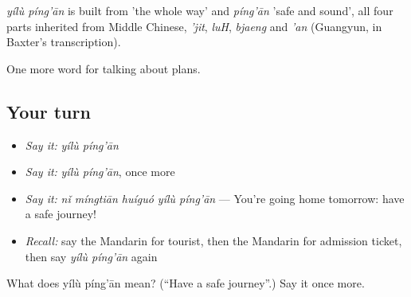 \begin{cousinweb}
\emph{yílù píng'ān} is built from  'the whole way' and \emph{píng'ān} 'safe and sound', all four parts inherited from Middle Chinese, \emph{'jit}, \emph{luH}, \emph{bjaeng} and \emph{'an} (Guangyun, in Baxter's transcription).
\end{cousinweb}

\begin{grammarlens}[title={What you've built}]
One more word for talking about plans.
\end{grammarlens}

\subsection*{Your turn}
\begin{itemize}
\raggedright
  \item \emph{Say it:} \emph{yílù píng'ān}
  \item \emph{Say it:} \emph{yílù píng'ān}, once more
  \item \emph{Say it:} \emph{nǐ míngtiān huíguó yílù píng'ān} — You're going home tomorrow: have a safe journey!
  \item \emph{Recall:} say the Mandarin for tourist, then the Mandarin for admission ticket, then say \emph{yílù píng'ān} again
\end{itemize}

\begin{tcolorbox}[breakable,colback=teal!4,colframe=teal!35!black,title={Before you move on}]
What does yílù píng'ān mean? (\textquotedblleft{}Have a safe journey\textquotedblright{}.) Say it once more.
\end{tcolorbox}
